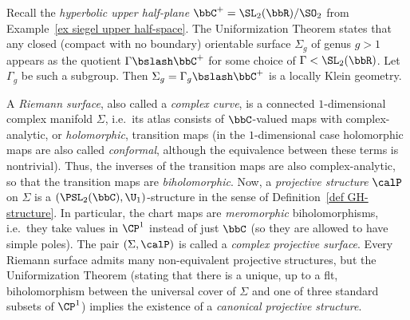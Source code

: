 \begin{example}
    Recall the \emph{hyperbolic upper half-plane} $\bbC^+=\SL_2(\bbR)\slash \SO_2$ from Example~\ref{ex siegel upper half-space}. The Uniformization Theorem states that any closed (compact with no boundary) orientable surface $\Sigma_g$ of genus $g>1$ appears as the quotient $\Gamma\bslash \bbC^+$ for some choice of $\Gamma<\SL_2(\bbR)$. Let $\Gamma_g$ be such a subgroup. Then $\Sigma_g=\Gamma_g\bslash \bbC^+$ is a locally Klein geometry.
\end{example}

\begin{example}\label{ex projective structure}
    A \emph{Riemann surface}, also called a \emph{complex curve}, is a connected $1$-dimensional complex manifold $\Sigma$, i.e.\ its atlas consists of $\bbC$-valued maps with complex-analytic, or \emph{holomorphic}, transition maps (in the $1$-dimensional case holomorphic maps are also called \emph{conformal}, although the equivalence between these terms is nontrivial). Thus, the inverses of the transition maps are also complex-analytic, so that the transition maps are \emph{biholomorphic}. Now, a \emph{projective structure} $\calP$ on $\Sigma$ is a $(\PSL_2(\bbC),\U_1)$-structure in the sense of Definition\ \ref{def GH-structure}. In particular, the chart maps are \emph{meromorphic} biholomorphisms, i.e.\ they take values in $\CP^1$ instead of just $\bbC$ (so they are allowed to have simple poles). The pair $(\Sigma,\calP)$ is called a \emph{complex projective surface}. Every Riemann surface admits many non-equivalent projective structures, but the Uniformization Theorem (stating that there is a unique, up to a \gls{flt}, biholomorphism between the universal cover of $\Sigma$ and one of three standard subsets of $\CP^1$) implies the existence of a \emph{canonical projective structure}.
\end{example}


